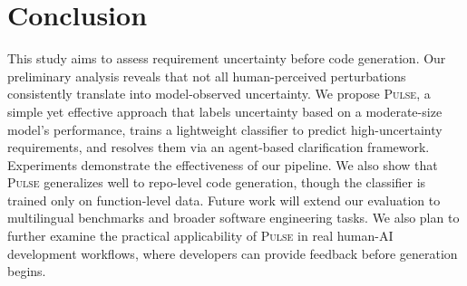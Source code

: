 \section{Conclusion}
\label{sec:conclusion}
This study aims to assess requirement uncertainty before code generation. Our preliminary analysis reveals that not all human-perceived perturbations consistently translate into model-observed uncertainty. We propose \textsc{Pulse}, a simple yet effective approach that labels uncertainty based on a moderate-size model's performance, trains a lightweight classifier to predict high-uncertainty requirements, and resolves them via an agent-based clarification framework. Experiments demonstrate the effectiveness of our pipeline. We also show that \textsc{Pulse} generalizes well to repo-level code generation, though the classifier is trained only on function-level data. Future work will extend our evaluation to multilingual benchmarks and broader software engineering tasks. We also plan to further examine the practical applicability of \textsc{Pulse} in real human-AI development workflows, where developers can provide feedback before generation begins.

